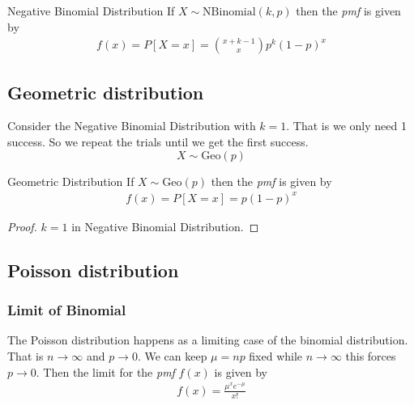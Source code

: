 \documentclass[16pt,a4paper]{article}
\begin{document}
\begin{thm}{Negative Binomial Distribution}
    If $X\sim \text{NBinomial}(k,p)$ then the \textit{pmf} is given by 
    \begin{align*}
        f(x)  = P[X=x]  = {x+k-1\choose x}p^k(1-p)^x
    \end{align*}
\end{thm}
\subsection{Geometric distribution}
Consider the Negative Binomial Distribution with $k=1$. That is we only need 1 success. So we repeat the trials until we get the first success.  
\[
    X\sim \text{Geo}(p)
\]
\begin{thm}{Geometric Distribution}
    If $X\sim \text{Geo}(p)$ then the \textit{pmf} is given by 
    \begin{align*}
        f(x) = P[X=x] = p(1-p)^x
    \end{align*}
    \begin{proof}
        $k=1$ in Negative Binomial Distribution. 
    \end{proof}
\end{thm}
\newpage
\subsection{Poisson distribution}
\subsubsection{Limit of Binomial}
The Poisson distribution happens as a limiting case of the binomial distribution. That is $n\to \infty$ and $p\to 0$. We can keep $\mu = np$ fixed while $n\to \infty$ this forces $p\to 0$. Then the limit for the \textit{pmf} $f(x)$ is given by 
\begin{align*}
    f(x) = \frac{\mu^x e^{-\mu}}{x!}
\end{align*}
\end{document}
